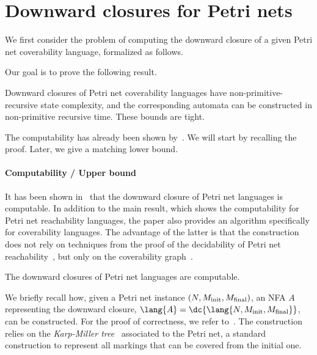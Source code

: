 \documentclass[../../diss.tex]{subfiles}
\begin{document}
\section{Downward closures for Petri nets}%
\label{Section:PNDC}%

We first consider the problem of computing the downward closure of a given Petri net coverability language, formalized as follows.

\begin{compproblem}
    \problemshort{($\PNDC$)}
\end{compproblem}

Our goal is to prove the following result.

\begin{theorem}%
\label{Theorem:PNDCGeneral}%
    Downward closures of Petri net coverability languages have non-primitive-recursive state complexity, and the corresponding automata can be constructed in non-primitive recursive time.
    These bounds are tight.
\end{theorem}

The computability has already been shown by~.
We will start by recalling the proof.
Later, we give a matching lower bound.

\paragraph{Computability / Upper bound}

It has been shown in~\cite{HabermehlMW10} that the downward closure of Petri net languages is computable.
In addition to the main result, which shows the computability for Petri net reachability languages, the paper also provides an algorithm specifically for coverability languages.
The advantage of the latter is that the construction does not rely on techniques from the proof of the decidability of Petri net reachability~\cite{Lambert92}, but only on the coverability graph~\cite{KarpM69}.

\begin{theorem}%
\label{Theorem:PNComputeDC}%
    The downward closures of Petri net languages are computable.
\end{theorem}

We briefly recall how, given a Petri net instance $(N,M_{\text{init}},M_{\text{final}})$, an NFA $A$ representing the downward closure, \ie $\lang{A} = \dc{\lang{N,\Minit,\Mfinal}}$, can be constructed.
For the proof of correctness, we refer to~\cite{HabermehlMW10}.
The construction relies on the \emph{Karp-Miller tree}~\cite{KarpM69} associated to the Petri net, a standard construction to represent all markings that can be covered from the initial one.
\end{document}
